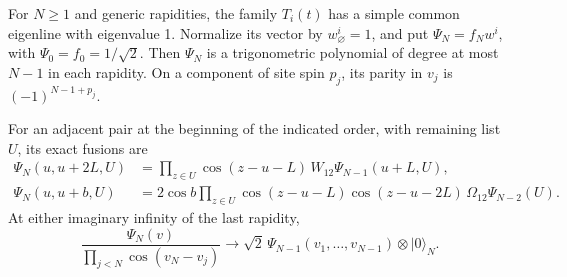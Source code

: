 \begin{auxlemma}
For \(N\ge1\) and generic rapidities, the family \(T_i(t)\) has a simple common eigenline with eigenvalue 1. Normalize its vector by \(w^i_\varnothing=1\), and put \(\Psi_N=f_Nw^i\), with \(\Psi_0=f_0=1/\sqrt2\). Then \(\Psi_N\) is a trigonometric polynomial of degree at most \(N-1\) in each rapidity. On a component of site spin \(p_j\), its parity in \(v_j\) is \((-1)^{N-1+p_j}\).

For an adjacent pair at the beginning of the indicated order, with remaining list \(U\), its exact fusions are
\[
\begin{aligned}
 \Psi_N(u,u+2L,U)
 &=\prod_{z\in U}\cos(z-u-L)\,
       W_{12}\Psi_{N-1}(u+L,U),\\
 \Psi_N(u,u+b,U)
 &=2\cos b\prod_{z\in U}\cos(z-u-L)\cos(z-u-2L)\,
       \Omega_{12}\Psi_{N-2}(U).
\end{aligned}
\]
At either imaginary infinity of the last rapidity,
\[
 \frac{\Psi_N(v)}{\prod_{j<N}\cos(v_N-v_j)}
 \longrightarrow \sqrt2\,\Psi_{N-1}(v_1,\ldots,v_{N-1})\otimes|0\rangle_N.
\]
\end{auxlemma}

